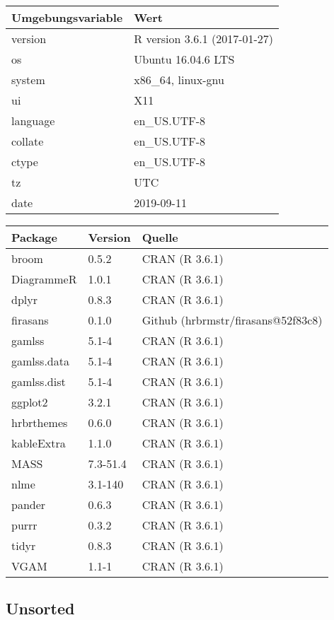 \documentclass[ngerman,a4paper,]{scrartcl}
\theoremstyle{definition}
\theoremstyle{definition}
\theoremstyle{definition}
\theoremstyle{remark}
\begin{document}
\begin{table}[H]
\centering
\begin{tabular}{ll}
\toprule
Umgebungsvariable & Wert\\
\midrule
version & R version 3.6.1 (2017-01-27)\\
os & Ubuntu 16.04.6 LTS\\
system & x86\_64, linux-gnu\\
ui & X11\\
language & en\_US.UTF-8\\
collate & en\_US.UTF-8\\
ctype & en\_US.UTF-8\\
tz & UTC\\
date & 2019-09-11\\
\bottomrule
\end{tabular}
\end{table}

\begin{table}[H]
\centering
\begin{tabular}{lll}
\toprule
Package & Version & Quelle\\
\midrule
broom & 0.5.2 & CRAN (R 3.6.1)\\
DiagrammeR & 1.0.1 & CRAN (R 3.6.1)\\
dplyr & 0.8.3 & CRAN (R 3.6.1)\\
firasans & 0.1.0 & Github (hrbrmstr/firasans@52f83c8)\\
gamlss & 5.1-4 & CRAN (R 3.6.1)\\
gamlss.data & 5.1-4 & CRAN (R 3.6.1)\\
gamlss.dist & 5.1-4 & CRAN (R 3.6.1)\\
ggplot2 & 3.2.1 & CRAN (R 3.6.1)\\
hrbrthemes & 0.6.0 & CRAN (R 3.6.1)\\
kableExtra & 1.1.0 & CRAN (R 3.6.1)\\
MASS & 7.3-51.4 & CRAN (R 3.6.1)\\
nlme & 3.1-140 & CRAN (R 3.6.1)\\
pander & 0.6.3 & CRAN (R 3.6.1)\\
purrr & 0.3.2 & CRAN (R 3.6.1)\\
tidyr & 0.8.3 & CRAN (R 3.6.1)\\
VGAM & 1.1-1 & CRAN (R 3.6.1)\\
\bottomrule
\end{tabular}
\end{table}

\hypertarget{unsorted}{%
\subsection{Unsorted}\label{unsorted}}
\end{document}
